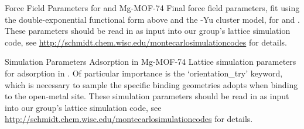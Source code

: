 \begin{subappendices}
\begin{section}{Force Field Parameters for {\co} and Mg-MOF-74}
Final force field parameters, fit using the double-exponential functional form
above and the \mgmof-Yu cluster model, for \co and \mgmof. 
These parameters
should be read in as input into our group's lattice simulation code, see 
\url{http://schmidt.chem.wisc.edu/montecarlosimulationcodes} for details.

\tiny

\normalsize

\end{section}
\begin{section}{Simulation Parameters {\co} Adsorption in Mg-MOF-74}
Lattice simulation parameters for \co adsorption in \mgmof. Of particular
importance is the `orientation_try' keyword, which is necessary to sample the
specific binding geometries \co adopts when binding to the open-metal site.
These simulation parameters
should be read in as input into our group's lattice simulation code, see 
\url{http://schmidt.chem.wisc.edu/montecarlosimulationcodes} for details.

\tiny

\normalsize

\end{section}

\end{subappendices}
